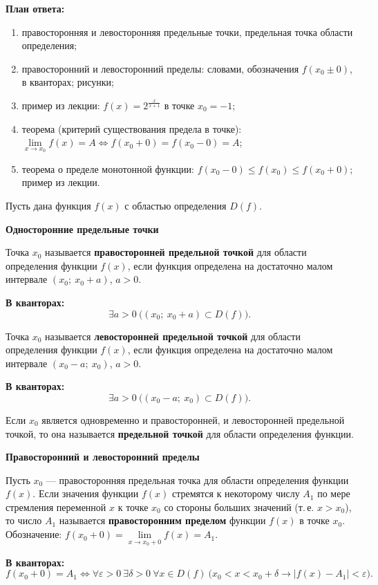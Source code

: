 \documentclass[a4paper,11pt]{article}
\newcommand{\eps}{\varepsilon}
\newcommand{\kv}{\par\noindent\textbf{\textcolor{oprc!85!black}{В кванторах:}}}
\newcommand{\podr}[1]{\par\needspace{8\baselineskip}\medskip
  {\large\bfseries\textcolor{oprc!80!black}{#1}}\par\nopagebreak\smallskip}
\newcommand{\plan}[1]{\begin{planbox}\textbf{План ответа:}
  \begin{enumerate}[nosep,leftmargin=*,label=\arabic*)]#1\end{enumerate}\end{planbox}}
\begin{document}
\plan{\item правосторонняя и левосторонняя предельные точки, предельная точка области определения;
\item правосторонний и левосторонний пределы: словами, обозначения $f(x_0 \pm 0)$, в кванторах; рисунки;
\item пример из лекции: $f(x) = 2^{\frac{x}{x+1}}$ в точке $x_0 = -1$;
\item теорема (критерий существования предела в точке): $\lim\limits_{x \to x_0} f(x) = A \iff f(x_0 + 0) = f(x_0 - 0) = A$;
\item теорема о пределе монотонной функции: $f(x_0 - 0) \le f(x_0) \le f(x_0 + 0)$; пример из лекции.}

Пусть дана функция $f(x)$ с областью определения $D(f)$.

\podr{Односторонние предельные точки}

\begin{opr}
Точка $x_0$ называется \textbf{правосторонней предельной точкой} для области определения функции $f(x)$,
если функция определена на достаточно малом интервале $(x_0;\ x_0 + a)$, $a > 0$.
\kv
\[
  \exists a > 0\ \bigl( (x_0;\ x_0 + a) \subset D(f) \bigr).
\]
\end{opr}

\begin{opr}
Точка $x_0$ называется \textbf{левосторонней предельной точкой} для области определения функции $f(x)$,
если функция определена на достаточно малом интервале $(x_0 - a;\ x_0)$, $a > 0$.
\kv
\[
  \exists a > 0\ \bigl( (x_0 - a;\ x_0) \subset D(f) \bigr).
\]
\end{opr}

\begin{opr}
Если $x_0$ является одновременно и правосторонней, и левосторонней предельной точкой, то она называется
\textbf{предельной точкой} для области определения функции.
\end{opr}

\podr{Правосторонний и левосторонний пределы}

\begin{opr}
Пусть $x_0$ --- правосторонняя предельная точка для области определения функции $f(x)$. Если значения функции $f(x)$
стремятся к некоторому числу $A_1$ по мере стремления переменной $x$ к точке $x_0$ со стороны больших значений
(т.\,е. $x > x_0$), то число $A_1$ называется \textbf{правосторонним пределом} функции $f(x)$ в точке $x_0$.
Обозначение: $f(x_0 + 0) = \lim\limits_{x \to x_0 + 0} f(x) = A_1$.
\kv
\[
  f(x_0 + 0) = A_1 \Leftrightarrow \forall \eps > 0\ \exists \delta > 0\ \forall x \in D(f)\
  \bigl( x_0 < x < x_0 + \delta \to |f(x) - A_1| < \eps \bigr).
\]
\end{opr}
\end{document}
